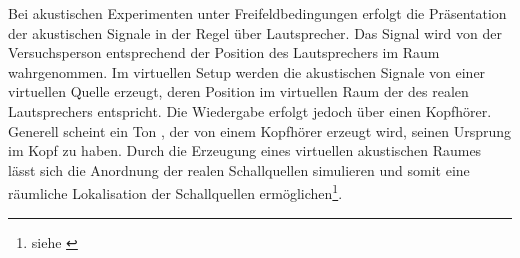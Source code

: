 

Bei akustischen Experimenten unter Freifeldbedingungen erfolgt die Präsentation der akustischen Signale in der Regel über Lautsprecher. Das Signal wird von der Versuchsperson entsprechend der Position des Lautsprechers im Raum wahrgenommen. Im virtuellen Setup werden die akustischen Signale von einer virtuellen Quelle erzeugt, deren Position im virtuellen Raum der des realen Lautsprechers entspricht. Die Wiedergabe erfolgt jedoch über einen Kopfhörer. Generell scheint ein Ton , der von einem Kopfhörer erzeugt wird, seinen Ursprung im Kopf zu haben. Durch die Erzeugung eines virtuellen akustischen Raumes lässt sich die Anordnung der realen Schallquellen simulieren und somit eine räumliche Lokalisation der Schallquellen ermöglichen\footnote{siehe \cite{SLAS}}.
